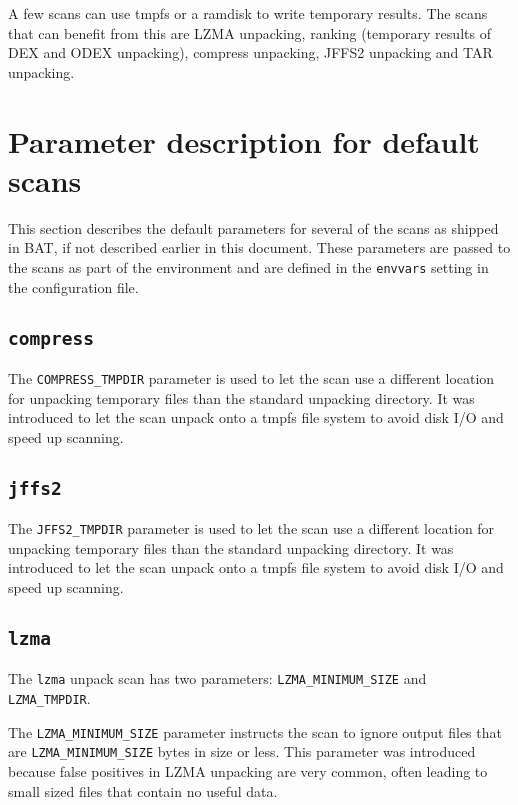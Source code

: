\documentclass[10pt]{article}
\begin{document}
A few scans can use tmpfs or a ramdisk to write temporary results. The scans
that can benefit from this are LZMA unpacking, ranking (temporary results of
DEX and ODEX unpacking), compress unpacking, JFFS2 unpacking and TAR unpacking.

\section{Parameter description for default scans}

This section describes the default parameters for several of the scans as
shipped in BAT, if not described earlier in this document. These parameters are
passed to the scans as part of the environment and are defined in the
\texttt{envvars} setting in the configuration file.

\subsection{\texttt{compress}}

The \texttt{COMPRESS\_TMPDIR} parameter is used to let the scan use a different
location for unpacking temporary files than the standard unpacking directory.
It was introduced to let the scan unpack onto a tmpfs file system to avoid disk
I/O and speed up scanning.

\subsection{\texttt{jffs2}}

The \texttt{JFFS2\_TMPDIR} parameter is used to let the scan use a different
location for unpacking temporary files than the standard unpacking directory.
It was introduced to let the scan unpack onto a tmpfs file system to avoid disk
I/O and speed up scanning.

\subsection{\texttt{lzma}}

The \texttt{lzma} unpack scan has two parameters: \texttt{LZMA\_MINIMUM\_SIZE}
and \texttt{LZMA\_TMPDIR}.

The \texttt{LZMA\_MINIMUM\_SIZE} parameter instructs the scan to ignore output
files that are \texttt{LZMA\_MINIMUM\_SIZE} bytes in size or less. This
parameter was introduced because false positives in LZMA unpacking are very
common, often leading to small sized files that contain no useful data.
\end{document}
